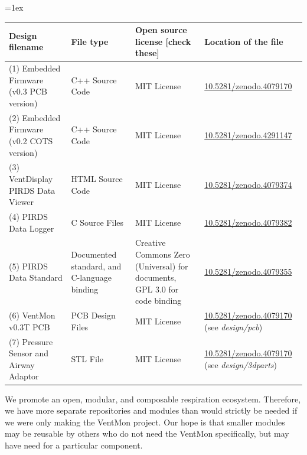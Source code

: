 \documentclass[11pt, letterpaper]{article}
\begin{document}
\tabulinesep=1ex
\begin{tabu} to \linewidth {|X[1.5]|X|X[1.5,1]|X[3]|}
\hline
\textbf{Design filename} & \textbf{File type} & \textbf{Open source license [check these]} & \textbf{Location of the file} \\\hline
(1) Embedded Firmware (v0.3 PCB version) & C++ Source Code & MIT License &  \href{https://doi.org/10.5281/zenodo.4079170}{10.5281/zenodo.4079170}\\\hline
(2) Embedded Firmware (v0.2 COTS version) & C++ Source Code & MIT License &  \href{https://doi.org/10.5281/zenodo.4291147}{10.5281/zenodo.4291147}\\\hline
(3) VentDisplay PIRDS Data Viewer  & HTML Source Code &  MIT License &  \href{http://doi.org/10.5281/zenodo.4079355}{10.5281/zenodo.4079374} \\\hline
(4) PIRDS Data Logger & C Source Files & MIT License & \href{https://doi.org/10.5281/zenodo.4079382}{10.5281/zenodo.4079382} \\\hline
(5) PIRDS Data Standard & Documented standard, and C-language binding & Creative Commons Zero (Universal) for documents, GPL 3.0 for code binding &
\href{http://doi.org/10.5281/zenodo.4079355}{10.5281/zenodo.4079355} \\\hline
(6) VentMon v0.3T PCB & PCB Design Files & MIT License &  \href{https://doi.org/10.5281/zenodo.4079170}{10.5281/zenodo.4079170} (see {\em design/pcb}) \\\hline
(7) Pressure Sensor and Airway Adaptor & STL File & MIT License &  \href{https://doi.org/10.5281/zenodo.4079170}{10.5281/zenodo.4079170} (see {\em design/3dparts}) \\\hline


\end{tabu}
\vspace{0.5cm}

We promote an open, modular, and composable respiration ecosystem. Therefore, we have more separate repositories and modules than would strictly be needed if we were only making the VentMon project. Our hope is that smaller modules may be reusable by others who do not need the VentMon specifically, but may have need for a particular component.
\end{document}

